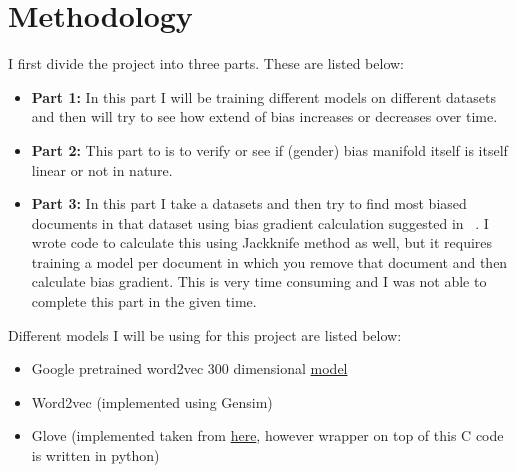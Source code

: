 \documentclass{article}
\begin{document}
\section{Methodology}

I first divide the project into three parts. These are listed below:

\begin{itemize}
    \item \textbf{Part 1:} In this part I will be training different models on different datasets and then will try to see how extend of bias increases or decreases over time.
    \item \textbf{Part 2:} This part to is to verify or see if (gender) bias manifold itself is itself linear or not in nature.
    \item \textbf{Part 3:} In this part I take a datasets and then try to find most biased documents in that dataset using bias gradient calculation suggested in ~\cite{brunet_understanding_2019}. I wrote code to calculate this using Jackknife method as well, but it requires training a model per document in which you remove that document and then calculate bias gradient. This is very time consuming and I was not able to complete this part in the given time.

\end{itemize}

Different models I will be using for this project are listed below:

\begin{itemize}
    \item Google pretrained word2vec 300 dimensional \href{
https://www.kaggle.com/datasets/leadbest/googlenewsvectorsnegative300}{model}
    \item Word2vec (implemented using Gensim)
    \item Glove (implemented taken from \href{https://github.com/stanfordnlp/GloVe}{here}, however wrapper on top of this C code is written in python)
\end{itemize}
\end{document}
